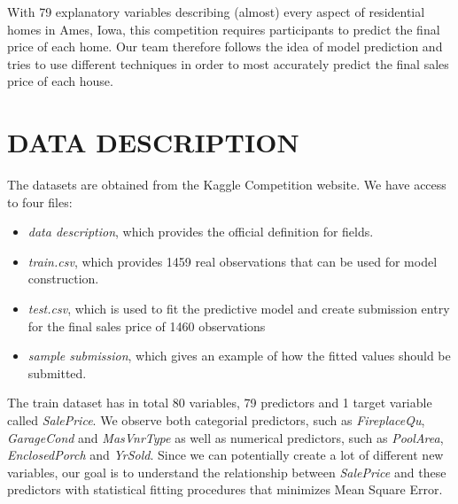 \documentclass[letterpaper, 10 pt, conference]{ieeeconf}\usepackage[]{graphicx}\usepackage[]{color}
\begin{document}
With 79 explanatory variables describing (almost) every aspect of residential homes in Ames, Iowa, this competition requires participants to predict the final price of each home. Our team therefore follows the idea of model prediction and tries to use different techniques in order to most accurately predict the final sales price of each house.

\section{DATA DESCRIPTION}
The datasets are obtained from the Kaggle Competition website. We have access to four files: 
\begin{itemize}
\item \textit{data description}, which provides the official definition for fields.
\item \textit{train.csv}, which provides 1459 real observations that can be used for model construction.
\item \textit{test.csv}, which is used to fit the predictive model and create submission entry for the final sales price of 1460 observations 
\item \textit{sample submission}, which gives an example of how the fitted values should be submitted.
\end{itemize}

The train dataset has in total 80 variables, 79 predictors and 1 target variable called \textit{SalePrice}. We observe both categorial predictors, such as \textit{FireplaceQu}, \textit{GarageCond} and \textit{MasVnrType} as well as numerical predictors, such as \textit{PoolArea}, \textit{EnclosedPorch} and \textit{YrSold}. Since we can potentially create a lot of different new variables, our goal is to understand the relationship between \textit{SalePrice} and these predictors with statistical fitting procedures that minimizes Mean Square Error.
\end{document}
